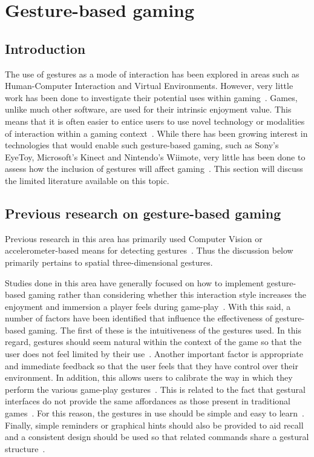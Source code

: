 \section{Gesture-based gaming}
\subsection{Introduction}
The use of gestures as a mode of interaction has been explored in areas such as Human-Computer Interaction and Virtual Environments. However, very little work has been done to investigate their potential uses within gaming~\citep{Krat07}. Games, unlike much other software, are used for their intrinsic enjoyment value. This means that it is often easier to entice users to use novel technology or modalities of interaction within a gaming context~\citep{Star00}. While there has been growing interest in technologies that would enable such gesture-based gaming, such as Sony's EyeToy, Microsoft's Kinect and Nintendo's Wiimote, very little has been done to assess how the inclusion of gestures will affect gaming~\citep{Wils09}. This section will discuss the limited literature available on this topic.

\subsection{Previous research on gesture-based gaming}
Previous research in this area has primarily used Computer Vision or accelerometer-based means for detecting gestures~\citep{Kang04,Payn06,Wils09}. Thus the discussion below primarily pertains to spatial three-dimensional gestures. 

Studies done in this area have generally focused on how to implement gesture-based gaming rather than considering whether this interaction style increases the enjoyment and immersion a player feels during game-play~\citep{Kang04,Krat07}. With this said, a number of factors have been identified that influence the effectiveness of gesture-based gaming. The first of these is the intuitiveness of the gestures used. In this regard, gestures should seem natural within the context of the game so that the user does not feel limited by their use~\citep{Kang04}. Another important factor is appropriate and immediate feedback so that the user feels that they have control over their environment. In addition, this allows users to calibrate the way in which they perform the various game-play gestures~\citep{Payn06}. This is related to the fact that gestural interfaces do not provide the same affordances as those present in traditional games~\citep{Kang04}. For this reason, the gestures in use should be simple and easy to learn~\citep{Payn06}. Finally, simple reminders or graphical hints should also be provided to aid recall and a consistent design should be used so that related commands share a gestural structure~\citep{Payn06}.

